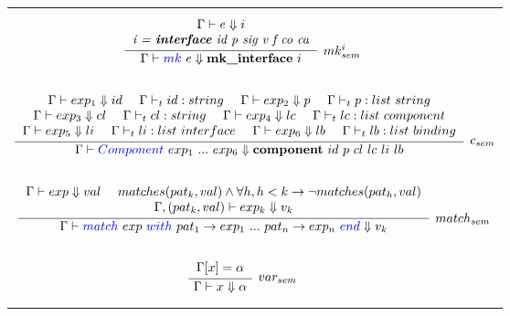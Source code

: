 \begin{table}
{\begin{tabular}{| c c |}
$$
\infer[mk^i_{sem}]{\env \vdash \blue{mk} \ e \Downarrow \textbf{mk\_interface} \ i}
{  \begin{tabular}{ c } 
		$\env \vdash e \Downarrow i$  \\
	   \textit{i = \textbf{interface} id p sig v f co ca}
	\end{tabular}} 
$$\\
&  \\
\multicolumn{2}{|c|}{
$$
\infer[c_{sem}]{\env \vdash \blue{Component} \ exp_1 \ ... \ exp_6 \Downarrow \textbf{component} \ id \ p \ cl \ lc \ li \ lb}
{  \begin{tabular}{ c } 
		$\env \vdash exp_1 \Downarrow id$ \ \ \ $\env \vdash_t id : string$ \ \ \
		$\env \vdash exp_2 \Downarrow p$ \ \ \ $\env \vdash_t p : list \ string$ \\
		$\env \vdash exp_3 \Downarrow cl$ \ \ \ $\env \vdash_t cl : string$ \ \ \
		$\env \vdash exp_4 \Downarrow lc$ \ \ \ $\env \vdash_t lc : list \ component$\\
		$\env \vdash exp_5 \Downarrow li$ \ \ \ $\env \vdash_t li : list \ interface$ \ \ \
		$\env \vdash exp_6 \Downarrow lb$ \ \ \ $\env \vdash_t lb : list \ binding$
	\end{tabular}} 
$$ 
}\\
&  \\
\multicolumn{2}{|c|}{ 
$$
\infer[match_{sem}]{\env \vdash \blue{match} \ exp \ \blue{with} \ pat_1 \rightarrow exp_1 \ ... \ pat_n \rightarrow exp_n \ \blue{end} \Downarrow v_k}
{  \begin{tabular}{ c } 
       $\env \vdash exp \Downarrow val \ \ \ \ matches(pat_k, val) \wedge \forall h, h < k \rightarrow \neg matches(pat_h, val)$ \\
       $\env, (pat_k, val) \vdash exp_k \Downarrow v_k$ 
	\end{tabular}} 
$$
}\\
& \\
$$
\infer[var_{sem}]{\env \vdash x \Downarrow \alpha}
{  \begin{tabular}{ c } 
	   $\env[x] = \alpha$  
	\end{tabular}} 
$$	&

\end{tabular}}
\end{table}

